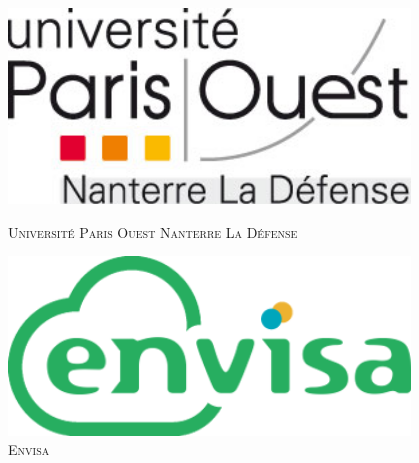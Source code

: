 
\thispagestyle{empty}
\begin{titlepage}
	\begin{center}
		\begin{minipage}[t]{0.48\textwidth}
		  \begin{center}
		    \includegraphics[width=0.8\textwidth]{images/Paris-ouest-logo.png} \\[0.5cm]
		    \begin{spacing}{1}
		      \textsc{\large Université Paris Ouest Nanterre La Défense}
		    \end{spacing}
		  \end{center}
		\end{minipage}
		\begin{minipage}[t]{0.48\textwidth}
		  \begin{center}
		    \includegraphics[width=0.8\textwidth]{images/envisa_logo.png} \\[0.5cm]
		    \textsc{\large Envisa}
		  \end{center}
		\end{minipage} \\[3cm]
		
		\textsc{\Large \reportsubject}\\[0.5cm]
		\HRule \\[0.4cm]
		{\huge \bfseries \reporttitle}\\[0.4cm]
		\HRule \\[1.5cm]
		

\end{center}
\end{titlepage}
